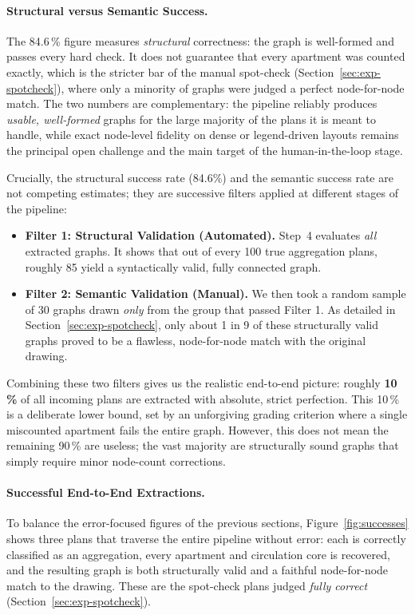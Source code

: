 \documentclass[12pt,a4paper,openright]{report}
\begin{document}
\paragraph{Structural versus Semantic Success.} The 84.6\,\% figure measures \emph{structural} correctness: the graph is well-formed and passes every hard check. It does not guarantee that every apartment was counted exactly, which is the stricter bar of the manual spot-check (Section~\ref{sec:exp-spotcheck}), where only a minority of graphs were judged a perfect node-for-node match. The two numbers are complementary: the pipeline reliably produces \emph{usable, well-formed} graphs for the large majority of the plans it is meant to handle, while exact node-level fidelity on dense or legend-driven layouts remains the principal open challenge and the main target of the human-in-the-loop stage.

Crucially, the structural success rate (84.6\%) and the semantic success rate are not competing estimates; they are successive filters applied at different stages of the pipeline:
\begin{itemize}
    \item \textbf{Filter 1: Structural Validation (Automated).} Step~4 evaluates \emph{all} extracted graphs. It shows that out of every 100 true aggregation plans, roughly 85 yield a syntactically valid, fully connected graph. 
    \item \textbf{Filter 2: Semantic Validation (Manual).} We then took a random sample of 30 graphs drawn \emph{only} from the group that passed Filter 1. As detailed in Section~\ref{sec:exp-spotcheck}, only about 1 in 9 of these structurally valid graphs proved to be a flawless, node-for-node match with the original drawing.
\end{itemize}
Combining these two filters gives us the realistic end-to-end picture: roughly \textbf{10\,\%} of all incoming plans are extracted with absolute, strict perfection. This 10\,\% is a deliberate lower bound, set by an unforgiving grading criterion where a single miscounted apartment fails the entire graph. However, this does not mean the remaining 90\,\% are useless; the vast majority are structurally sound graphs that simply require minor node-count corrections.

\paragraph{Successful End-to-End Extractions.} To balance the error-focused figures of the previous sections, Figure~\ref{fig:successes} shows three plans that traverse the entire pipeline without error: each is correctly classified as an aggregation, every apartment and circulation core is recovered, and the resulting graph is both structurally valid and a faithful node-for-node match to the drawing. These are the spot-check plans judged \emph{fully correct}
(Section~\ref{sec:exp-spotcheck}).
\end{document}
